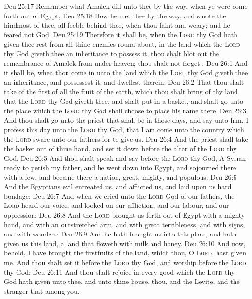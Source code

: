 \vs Deu 25:17 Remember what Amalek did unto thee by the way, when ye were come forth out of Egypt;
\vs Deu 25:18 How he met thee by the way, and smote the hindmost of thee,  all  feeble behind thee, when thou  faint and weary; and he feared not God.
\vs Deu 25:19 Therefore it shall be, when the \textsc{Lord} thy God hath given thee rest from all thine enemies round about, in the land which the \textsc{Lord} thy God giveth thee  an inheritance to possess it,  thou shalt blot out the remembrance of Amalek from under heaven; thou shalt not forget .
\vs Deu 26:1 And it shall be, when thou  come in unto the land which the \textsc{Lord} thy God giveth thee  an inheritance, and possessest it, and dwellest therein;
\vs Deu 26:2 That thou shalt take of the first of all the fruit of the earth, which thou shalt bring of thy land that the \textsc{Lord} thy God giveth thee, and shalt put  in a basket, and shalt go unto the place which the \textsc{Lord} thy God shall choose to place his name there.
\vs Deu 26:3 And thou shalt go unto the priest that shall be in those days, and say unto him, I profess this day unto the \textsc{Lord} thy God, that I am come unto the country which the \textsc{Lord} sware unto our fathers for to give us.
\vs Deu 26:4 And the priest shall take the basket out of thine hand, and set it down before the altar of the \textsc{Lord} thy God.
\vs Deu 26:5 And thou shalt speak and say before the \textsc{Lord} thy God, A Syrian ready to perish  my father, and he went down into Egypt, and sojourned there with a few, and became there a nation, great, mighty, and populous:
\vs Deu 26:6 And the Egyptians evil entreated us, and afflicted us, and laid upon us hard bondage:
\vs Deu 26:7 And when we cried unto the \textsc{Lord} God of our fathers, the \textsc{Lord} heard our voice, and looked on our affliction, and our labour, and our oppression:
\vs Deu 26:8 And the \textsc{Lord} brought us forth out of Egypt with a mighty hand, and with an outstretched arm, and with great terribleness, and with signs, and with wonders:
\vs Deu 26:9 And he hath brought us into this place, and hath given us this land,  a land that floweth with milk and honey.
\vs Deu 26:10 And now, behold, I have brought the firstfruits of the land, which thou, O \textsc{Lord}, hast given me. And thou shalt set it before the \textsc{Lord} thy God, and worship before the \textsc{Lord} thy God:
\vs Deu 26:11 And thou shalt rejoice in every good  which the \textsc{Lord} thy God hath given unto thee, and unto thine house, thou, and the Levite, and the stranger that  among you.
